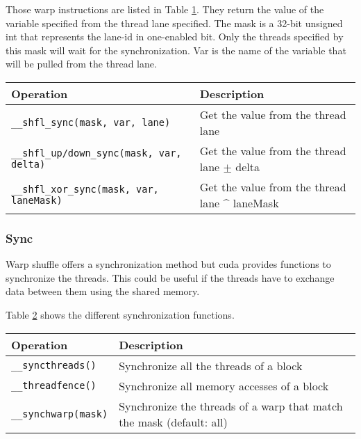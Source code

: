Those warp instructions are listed in Table \ref{tab:analyze:cuda:synchronization:warp-shuffle}.
They return the value of the variable specified from the thread lane specified.
The mask is a 32-bit unsigned int that represents the lane-id in one-enabled bit.
Only the threads specified by this mask will wait for the synchronization.
Var is the name of the variable that will be pulled from the thread lane.

\begin{table}[ht]
    \centering
    \begin{tabular}{|m{}|m{}|}
        \hline
        \textbf{Operation} & \textbf{Description} \\
        \hline
        \texttt{\_\_shfl\_sync(mask, var, lane)} & Get the value from the thread lane\\
        \hline
        \texttt{\_\_shfl\_up/down\_sync(mask, var, delta)} & Get the value from the thread lane $\pm$ delta\\
        \hline
        \texttt{\_\_shfl\_xor\_sync(mask, var, laneMask)} & Get the value from the thread lane \^{} laneMask\\
        \hline
    \end{tabular}
    \label{tab:analyze:cuda:synchronization:warp-shuffle}
\end{table}


\subsubsection{Sync}
\label{ch:analyze:cuda:synchronization:sync}

Warp shuffle offers a synchronization method but \acrshort{cuda} provides
functions to synchronize the threads.
This could be useful if the threads have to exchange data between them using
the shared memory.

Table \ref{tab:analyze:cuda:synchronization:sync} shows the different
synchronization functions.

\begin{table}[ht]
    \centering
    \begin{tabular}{|m{}|m{}|}
        \hline
        \textbf{Operation} & \textbf{Description} \\
        \hline
        \texttt{\_\_syncthreads()} & Synchronize all the threads of a block\\
        \hline
        \texttt{\_\_threadfence()} & Synchronize all memory accesses of a block\\
        \hline
        \texttt{\_\_synchwarp(mask)} & Synchronize the threads of a warp that match the mask (default: all)\\
        \hline
    \end{tabular}
    \label{tab:analyze:cuda:synchronization:sync}
\end{table}


